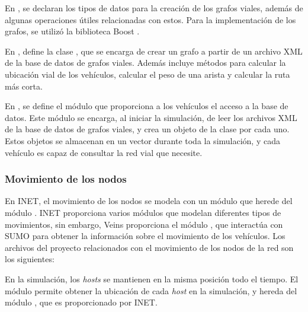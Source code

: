 En , se declaran los tipos de datos para la creación
de los grafos viales, además de algunas operaciones útiles relacionadas con
estos. Para la implementación de los grafos, se utilizó la biblioteca Boost
\cite{Boost}.

En , define la clase , que se encarga de
crear un grafo a partir de un archivo XML de la base de datos de grafos viales.
Además incluye métodos para calcular la ubicación vial de los vehículos,
calcular el peso de una arista y calcular la ruta más corta.

En , se define el módulo que proporciona a los
vehículos el acceso a la base de datos. Este módulo se encarga, al iniciar la
simulación, de leer los archivos XML de la base de datos de grafos viales, y
crea un objeto de la clase  por cada uno. Estos objetos se
almacenan en un vector durante toda la simulación, y cada vehículo es capaz de
consultar la red vial que necesite.


\subsubsection{Movimiento de los nodos}

\label{subsubsec:movimiento_de_los_nodos}

En INET, el movimiento de los nodos se modela con un módulo que herede del
módulo . INET proporciona varios módulos que modelan
diferentes tipos de movimientos, sin embargo, Veins proporciona el módulo
, que interactúa con SUMO para obtener la información
sobre el movimiento de los vehículos. Los archivos del proyecto relacionados
con el movimiento de los nodos de la red son los siguientes:
\newpage


\begin{sloppypar}
En la simulación, los \textit{hosts} se mantienen en la misma posición todo el
tiempo. El módulo  permite obtener la ubicación de
cada \textit{host} en la simulación, y hereda del módulo
, que es proporcionado por INET.
\end{sloppypar}

